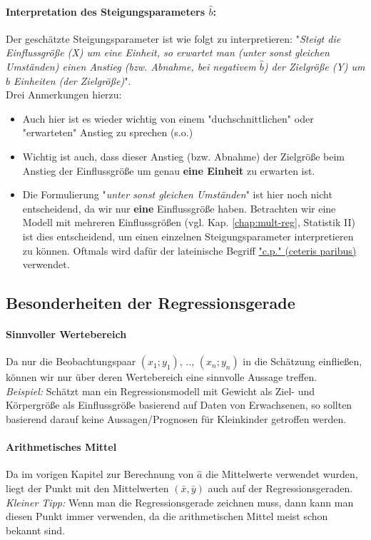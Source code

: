 \documentclass[a4paper]{article}
\begin{document}
\paragraph{Interpretation des Steigungsparameters $\hat b$:} Der geschätzte Steigungsparameter ist wie folgt zu interpretieren: "\textit{Steigt die Einflussgröße (X) um eine Einheit, so erwartet man (unter sonst gleichen Umständen) einen Anstieg (bzw. Abnahme, bei negativem $\hat b$) der Zielgröße (Y) um $\hat b$ Einheiten (der Zielgröße)}".\\
Drei Anmerkungen hierzu:
\begin{itemize}
    \item Auch hier ist es wieder wichtig von einem "duchschnittlichen" oder "erwarteten" Anstieg zu sprechen (s.o.)
    \item Wichtig ist auch, dass dieser Anstieg (bzw. Abnahme) der Zielgröße beim Anstieg der Einflussgröße um genau \textbf{eine Einheit} zu erwarten ist.
    \item Die Formulierung "\textit{unter sonst gleichen Umständen}" ist hier noch nicht entscheidend, da wir nur \textbf{eine} Einflussgröße haben. Betrachten wir eine Modell mit mehreren Einflussgrößen (vgl. Kap. \ref{chap:mult-reg}, Statistik II) ist dies entscheidend, um einen einzelnen Steigungsparameter interpretieren zu können. Oftmals wird dafür der lateinische Begriff \href{https://de.wikipedia.org/wiki/Ceteris_paribus}{"c.p." (ceteris paribus)} verwendet.
\end{itemize}

\subsection{Besonderheiten der Regressionsgerade}\label{sec:obacht}
\paragraph{Sinnvoller Wertebereich} Da nur die Beobachtungspaar $(x_1;y_1)$, .., $(x_n;y_n)$ in die Schätzung einfließen, können wir nur über deren Wertebereich eine sinnvolle Aussage treffen.\\
\textit{Beispiel:} Schätzt man ein Regressionsmodell mit Gewicht als Ziel- und Körpergröße als Einflussgröße basierend auf Daten von Erwachsenen, so sollten basierend darauf keine Aussagen/Progno\-sen für Kleinkinder getroffen werden.

\paragraph{Arithmetisches Mittel} Da im vorigen Kapitel zur Berechnung von $\hat{a}$ die Mittelwerte verwendet wurden, liegt der Punkt mit den Mittelwerten $(\bar{x},\bar{y})$ auch auf der Regressionsgeraden.\\
\textit{Kleiner Tipp:} Wenn man die Regressionsgerade zeichnen muss, dann kann man diesen Punkt immer verwenden, da die arithmetischen Mittel meist schon bekannt sind.
\end{document}
